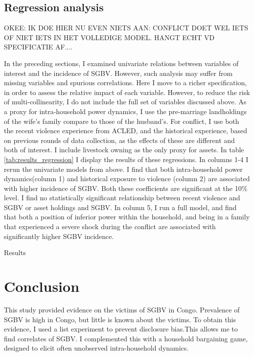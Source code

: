 \documentclass[10pt,a4paper]{scrartcl} %
\newcommand{\tableloc}{C:/Users/Koen/Dropbox/PhD/Papers/CongoGBV/Tables}
\begin{document}
\subsection*{Regression analysis}
OKEE: IK DOE HIER NU EVEN NIETS AAN: CONFLICT DOET WEL IETS OF NIET IETS IN HET VOLLEDIGE MODEL. HANGT ECHT VD SPECIFICATIE AF....

In the preceding sections, I examined univariate relations between variables of interest and the incidence of SGBV. However, such analysis may suffer from missing variables and spurious correlations. Here I move to a richer specification, in order to assess the relative impact of each variable. However, to reduce the risk of multi-collinearity, I do not include the full set of variables discussed above. As a proxy for intra-household power dynamics, I use the pre-marriage landholdings of the wife's family compare to those of the husband's. For conflict, I use both the recent violence experience from ACLED, and the historical experience, based on previous rounds of data collection, as the effects of these are different and both of interest. I include livestock owning as the only proxy for assets. In table \ref{tab:results_regression} I display the results of these regressions. In columns 1-4 I rerun the univariate models from above. I find that both intra-household power dynamics(column 1) and historical exposure to violence (column 2) are associated with higher incidence of SGBV. Both these coefficients are significant at the 10\% level. I find no statistically significant relationship between recent violence and SGBV or asset holdings and SGBV.  In column 5, I run a full model, and find that both a position of inferior power within the household, and being in a family that experienced a severe shock during the conflict are associated with significantly higher SGBV incidence.

\newcommand{\coeffget}[3]{\csvreader[filter=\equal{\reg}{#1} \and \equal{\var}{#2}]{\tableloc/regs.csv}{var=\var,reg=\reg,#3=\coeff}{\coeff}}

\begin{table}
	\caption{Results}\label{tab:results_regression}
	\begin{center}
	
	\end{center}
\end{table}


\section*{Conclusion}
This study provided evidence on the victims of SGBV in Congo. Prevalence of SGBV is high in Congo, but little is known about the victims. To obtain this evidence, I used a list experiment to prevent disclosure bias.This allows me to find correlates of SGBV. I complemented this with a household bargaining game, designed to elicit often unobserved intra-household dynamics.
\end{document}
